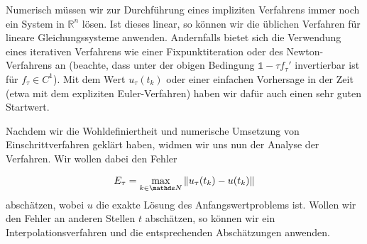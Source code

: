 Numerisch müssen wir zur Durchführung eines impliziten Verfahrens immer noch ein System in $\mathbb{R}^n$ lösen. Ist dieses linear, so können wir die üblichen Verfahren für lineare Gleichungssysteme anwenden. Andernfalls bietet sich die Verwendung eines iterativen Verfahrens wie einer Fixpunktiteration oder des Newton-Verfahrens an (beachte, dass unter der obigen Bedingung $\mathds{1}-\tau f_\tau'$ invertierbar ist für $f_\tau \in C^1$). Mit dem Wert $u_\tau(t_k)$ oder einer einfachen Vorhersage in der Zeit (etwa mit dem expliziten Euler-Verfahren) haben wir dafür auch einen sehr guten Startwert. 

Nachdem wir die Wohldefiniertheit und numerische Umsetzung von Einschrittverfahren geklärt haben, widmen wir uns nun der Analyse der Verfahren. Wir wollen dabei den Fehler

\begin{equation}\label{eq:einschrittfehler} 
E_\tau  = \max_{k\in\N} \Vert u_\tau(t_k) - u(t_k) \Vert 
\end{equation}
%
abschätzen, wobei $u$ die exakte Lösung des Anfangswertproblems ist. Wollen wir den Fehler an anderen Stellen $t$ abschätzen, so können wir ein Interpolationsverfahren und die entsprechenden Abschätzungen anwenden. 

